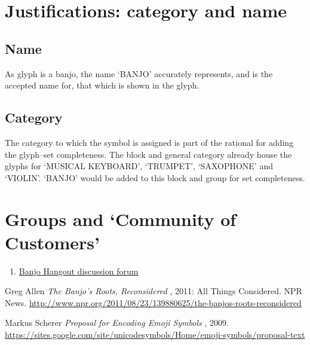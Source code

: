 \documentclass[12pt]{article}
\begin{document}
  \section{Justifications: category and name}
    \subsection{Name}
    As glyph is a banjo, the name `BANJO' accurately represents, and is 
    the accepted name for, that which is shown in the glyph.

    \subsection{Category}
    The category to which the symbol is assigned is part of the rational for
    adding the glyph--set completeness. The block and general category already
    house the glyphs for `MUSICAL KEYBOARD', `TRUMPET', `SAXOPHONE' and `VIOLIN'. 
    `BANJO' would be added to this block and group for set completeness.

  \section{Groups and `Community of Customers'}
    \begin{enumerate}
      \item \href{http://www.banjohangout.org/topic/278863}{Banjo Hangout discussion forum}
    \end{enumerate}

  \begin{thebibliography}{1}
     Greg Allen {\em The Banjo's Roots, Reconsidered } , 2011: All Things Considered. NPR News. \url{http://www.npr.org/2011/08/23/139880625/the-banjos-roots-reconsidered}

     Markus Scherer {\em Proposal for Encoding Emoji Symbols } , 2009. \url{https://sites.google.com/site/unicodesymbols/Home/emoji-symbols/proposal-text}
  \end{thebibliography}
\end{document}
